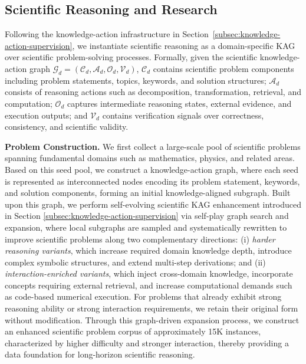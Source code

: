 \documentclass{llmxive}
\begin{document}

\subsection{Scientific Reasoning and Research}
\label{sec:science-data-pipeline}
Following the knowledge-action infrastructure in Section~\ref{subsec:knowledge-action-supervision}, we instantiate scientific reasoning as a domain-specific KAG over scientific problem-solving processes. Formally, given the scientific knowledge-action graph $\mathcal{G}_d = (\mathcal{C}_d, \mathcal{A}_d, \mathcal{O}_d, \mathcal{V}_d)$,  $\mathcal{C}_d$ contains scientific problem components including problem statements, topics, keywords, and solution structures; $\mathcal{A}_d$ consists of reasoning actions such as decomposition, transformation, retrieval, and computation; $\mathcal{O}_d$ captures intermediate reasoning states, external evidence, and execution outputs; and $\mathcal{V}_d$ contains verification signals over correctness, consistency, and scientific validity.

\textbf{Problem Construction.} We first collect a large-scale pool of scientific problems spanning fundamental domains such as mathematics, physics, and related areas. Based on this seed pool, we construct a knowledge-action graph, where each seed is represented as interconnected nodes encoding its problem statement, keywords, and solution components, forming an initial knowledge-aligned subgraph. Built upon this graph, we perform self-evolving scientific KAG enhancement introduced in Section \ref{subsec:knowledge-action-supervision} via self-play graph search and expansion, where local subgraphs are sampled and systematically rewritten to improve scientific problems along two complementary directions: (i) \emph{harder reasoning variants}, which increase required domain knowledge depth, introduce complex symbolic structures, and extend multi-step derivations; and (ii) \emph{interaction-enriched variants}, which inject cross-domain knowledge, incorporate concepts requiring external retrieval, and increase computational demands such as code-based numerical execution. For problems that already exhibit strong reasoning ability or strong interaction requirements, we retain their original form without modification. Through this graph-driven expansion process, we construct an enhanced scientific problem corpus of approximately 15K instances, characterized by higher difficulty and stronger interaction, thereby providing a data foundation for long-horizon scientific reasoning.
\end{document}
